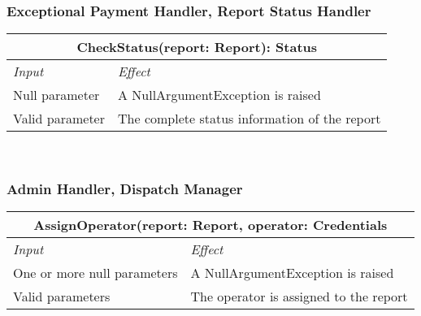 		
		
		\subsubsection*{Exceptional Payment Handler, Report Status Handler}
			\begin{tabular}{ |l|l| }
				\hline
				\multicolumn{2}{|c|}{CheckStatus(report: Report): Status}\\
				\hline
				\textit{Input} & \textit{Effect}\\ \hline
				Null parameter & A NullArgumentException is raised\\ \hline
				Valid parameter & The complete status information of the report\\ \hline
			\end{tabular}
			\\
		
		
		
		\subsubsection*{Admin Handler, Dispatch Manager}
			\begin{tabular}{ |l|l| }
				\hline
				\multicolumn{2}{|c|}{AssignOperator(report: Report, operator: Credentials}\\
				\hline
				\textit{Input} & \textit{Effect}\\ \hline
				One or more null parameters & A NullArgumentException is raised\\ \hline
				Valid parameters & The operator is assigned to the report\\ \hline
			\end{tabular}
			\\
		
		
		
